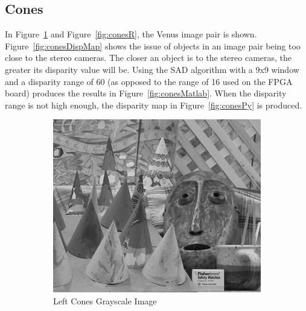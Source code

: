 \subsection{Cones}
\label{sec:cones}

In Figure~\ref{fig:conesL} and Figure~\ref{fig:conesR}, the Venus image pair is shown. Figure~\ref{fig:conesDispMap} shows the issue of objects in an image pair being too close to the stereo cameras. The closer an object is to the stereo cameras, the greater its disparity value will be. Using the SAD algorithm with a 9x9 window and a disparity range of 60 (as opposed to the range of 16 used on the FPGA board) produces the results in Figure~\ref{fig:conesMatlab}. When the disparity range is not high enough, the disparity map in Figure~\ref{fig:conesPy} is produced.

\begin{figure}
\begin{center}
	\begin{subfigure}{0.45\textwidth}
		\includegraphics[width=\textwidth]{figures/conesL.png}
		\caption{Left Cones Grayscale Image}
		\label{fig:conesL}
	\end{subfigure}
	\begin{subfigure}{0.45\textwidth}

\end{subfigure}
\end{center}
\end{figure}
